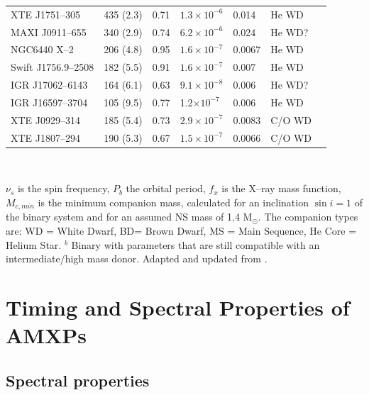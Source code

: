 \documentclass[graybox]{svmult}
\begin{document}
\begin{table}
\begin{center}
\begin{tabular}{lllllll}
\hline
XTE J1751--305 & 435 (2.3) &  0.71 & $1.3\times 10^{-6}$ & 0.014  & He WD &   \cite{Markwardt2002,DAvanzo2009}\\
MAXI J0911--655 & 340 (2.9) & 0.74 & $6.2\times 10^{-6}$ & 0.024  & He WD? &   \cite{Sanna2017a}\\
NGC6440 X--2 & 206 (4.8) & 0.95 & $1.6\times 10^{-7}$ & 0.0067 & He WD & \cite{Altamirano2010}\\
Swift J1756.9--2508  & 182  (5.5) &  0.91 &  $1.6\times 10^{-7}$ & 0.007  & He WD &  \cite{Krimm2007}\\
IGR J17062--6143  & 164  (6.1) &  0.63 &  $9.1\times 10^{-8}$ & 0.006  & He WD? &  \cite{Strohmayer2017}\\
IGR J16597--3704 & 105 (9.5) & 0.77 & 1.2$\times 10^{-7}$ & 0.006 & He WD & \cite{Sanna2018a}\\
\hline
XTE J0929--314  & 185  (5.4) & 0.73 & $2.9\times 10^{-7}$ & 0.0083  & C/O WD  & \cite{Galloway2002,Giles2005}\\
XTE J1807--294  & 190  (5.3) & 0.67 & $1.5\times 10^{-7}$ & 0.0066  & C/O WD  & \cite{Campana2003,DAvanzo2009} \\
\hline
\hline
\end{tabular}\\
\end{center}
$\nu_{s}$ is the spin frequency, $P_{b}$ the orbital period, $f_{x}$
is the X--ray mass function, $M_{c,min}$ is the minimum companion mass, calculated for an inclination $\sin i =1$ of the
binary system and for an assumed NS mass of 1.4 M$_\odot$. 
The companion types are: WD = White Dwarf, BD= Brown Dwarf, MS = Main Sequence, He Core = Helium Star.\newline
$^{b}$ Binary with parameters that are still compatible with an intermediate/high mass donor.\newline
Adapted and updated from \cite{Patruno2012a}.
\label{tab:lmxbs}
\end{table}






\section{Timing and Spectral Properties of AMXPs}

\subsection{Spectral properties}
\end{document}
